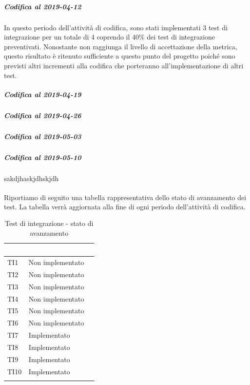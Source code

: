 \subparagraph{Codifica al 2019-04-12}
In questo periodo dell'attività di codifica, sono stati implementati 3 test di integrazione per un totale di 4 coprendo il 40\% dei test di integrazione preventivati.
Nonostante non raggiunga il livello di accettazione della
metrica, questo risultato è ritenuto sufficiente a questo punto del progetto poiché sono previsti altri incrementi alla codifica che porteranno all'implementazione di altri test. 

\subparagraph{Codifica al 2019-04-19}

\subparagraph{Codifica al 2019-04-26}

\subparagraph{Codifica al 2019-05-03}

\subparagraph{Codifica al 2019-05-10}
sakdjhaskjdhskjdh
\\
\\
Riportiamo di seguito una tabella rappresentativa dello stato di avanzamento dei test. La tabella verrà aggiornata alla fine di ogni periodo dell'attività di codifica.

	\begin{longtable}{|>{\centering\arraybackslash}m{1.6cm}|>{\centering\arraybackslash}m{6.41cm}|>{\centering\arraybackslash}m{3.1cm}|}		
	\rowcolor{LightBlue}
	\textbf{\textcolor{white}{Test}}
	& \textbf{\textcolor{white}{Stato}}\\
	\hline
	TI1
	& Non implementato
	\\ \hline
	\rowcolor{LightGray}
	TI2
	& Non implementato
	\\ \hline
	TI3
	& Non implementato
	\\ \hline
	\rowcolor{LightGray}
	TI4
	& Non implementato
	\\ \hline
	TI5
	& Non implementato
	\\ \hline
	\rowcolor{LightGray}
	TI6
	& Non implementato
	\\ \hline	
	TI7
	& Implementato
	\\ \hline	
	\rowcolor{LightGray}
	TI8
	& Implementato
	\\ \hline	
	TI9
	& Implementato
	\\ \hline	
	\rowcolor{LightGray}
	TI10
	& Implementato
	\\ \hline	
	\caption{Test di integrazione - stato di avanzamento}
\end{longtable}

